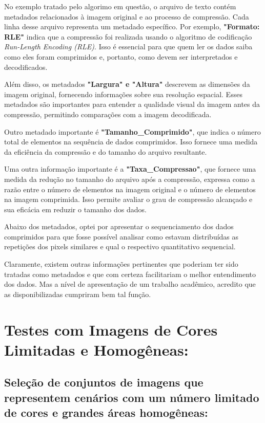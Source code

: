 \documentclass{article}
\begin{document}
No exemplo tratado pelo algorimo em questão, o arquivo de texto contém metadados relacionados à imagem original e ao processo de compressão. Cada linha desse arquivo representa um metadado específico. Por exemplo, \textbf{"Formato: RLE"} indica que a compressão foi realizada usando o algoritmo de codificação \textit{Run-Length Encoding (RLE)}. Isso é essencial para que quem ler os dados saiba como eles foram comprimidos e, portanto, como devem ser interpretados e decodificados.

Além disso, os metadados \textbf{"Largura" e "Altura"} descrevem as dimensões da imagem original, fornecendo informações sobre sua resolução espacial. Esses metadados são importantes para entender a qualidade visual da imagem antes da compressão, permitindo comparações com a imagem decodificada.

Outro metadado importante é \textbf{"Tamanho\_Comprimido"}, que indica o número total de elementos na sequência de dados comprimidos. Isso fornece uma medida da eficiência da compressão e do tamanho do arquivo resultante.

Uma outra informação importante é a \textbf{"Taxa\_Compressao"}, que fornece uma medida da redução no tamanho do arquivo após a compressão, expressa como a razão entre o número de elementos na imagem original e o número de elementos na imagem comprimida. Isso permite avaliar o grau de compressão alcançado e sua eficácia em reduzir o tamanho dos dados.

Abaixo dos metadados, optei por apresentar o sequenciamento dos dados comprimidos para que fosse possível analisar como estavam distribuídas as repetições dos pixels similares e qual o respectivo quantitativo sequencial.

Claramente, existem outras informações pertinentes que poderiam ter sido tratadas como metadados e que com certeza facilitariam o melhor entendimento dos dados. Mas a nível de apresentação de um trabalho acadêmico, acredito que as disponibilizadas cumpriram bem tal função.

\section{Testes com Imagens de Cores Limitadas e Homogêneas:}
\subsection{Seleção de conjuntos de imagens que representem cenários com um número limitado de cores e grandes áreas homogêneas:}
\end{document}
